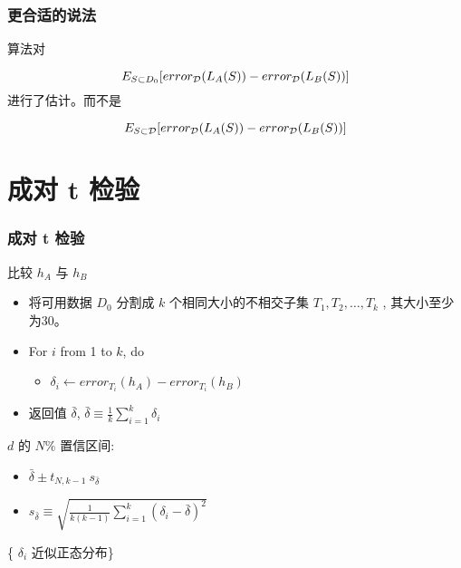 \documentclass{beamer}
\begin{document}
\begin{frame}
\frametitle{更合适的说法}
\label{sec-6-4}


算法对

\[ E_{S \subset D_{0}}[ error_{\cal{D}}(L_{A}(S)) - error_{\cal{D}}(L_{B}(S))] \]
进行了估计。而不是 

\[ E_{S \subset \cal{D}}[ error_{\cal{D}}(L_{A}(S)) - error_{\cal{D}}(L_{B}(S))] \]
\end{frame}
\section{成对 t 检验}
\label{sec-7}
\begin{frame}
\frametitle{成对 t 检验}
\label{sec-7-1}


比较 $h_{A}$ 与 $h_{B}$
\begin{itemize}
\item 将可用数据 $D_{0}$ 分割成 $k$ 个相同大小的不相交子集 $T_{1}, T_{2},\ldots, T_{k}$ , 其大小至少为30。
\item For $i$ from 1 to $k$, do
\begin{itemize}
\item $\delta_{i} \leftarrow error_{T_{i}}(h_{A}) - error_{T_{i}}(h_{B})$
\end{itemize}
\item 返回值 $\bar{\delta}$, $\bar{\delta} \equiv \frac{1}{k}\sum_{i=1}^{k} \delta_{i}$
\end{itemize}

$d$ 的 $N\%$ 置信区间:
\begin{itemize}
\item $\bar{\delta} \pm t_{N,k-1} \ s_{\bar{\delta}}$
\item $s_{\bar{\delta}} \equiv \sqrt{\frac{1}{k(k-1)} \sum_{i=1}^{k}(\delta_{i} -\bar{\delta})^{2}}$
\end{itemize}

\{ $\delta_{i}$ 近似正态分布\}
\end{frame}
\end{document}
